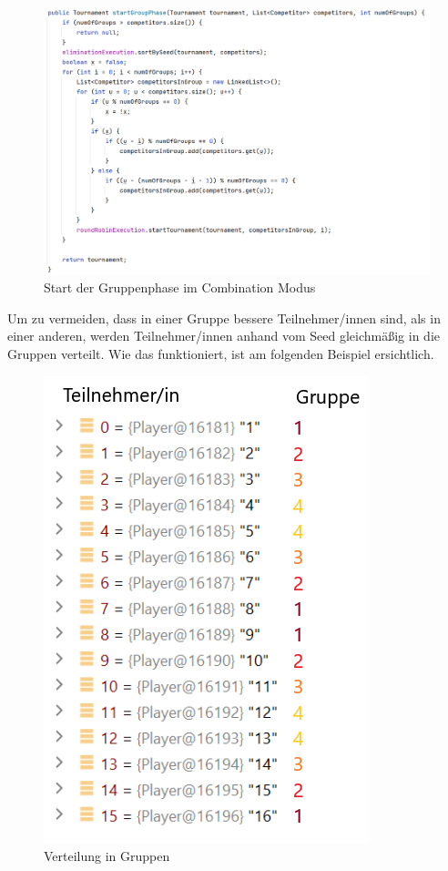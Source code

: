 \begin{figure}[H]
    \includegraphics[scale=0.4]{pics/backend/combination/combination_startGroupPhase.png}
    \caption{Start der Gruppenphase im Combination Modus}
\end{figure}

Um zu vermeiden, dass in einer Gruppe bessere Teilnehmer/innen sind, als in einer anderen, werden Teilnehmer/innen anhand vom Seed gleichmäßig in die Gruppen verteilt. Wie das funktioniert, ist am folgenden Beispiel ersichtlich.

\begin{figure}[H]
    \includegraphics[scale=0.8]{pics/backend/combination/combination_group_distribution.png}
    \caption{Verteilung in Gruppen}
\end{figure}

